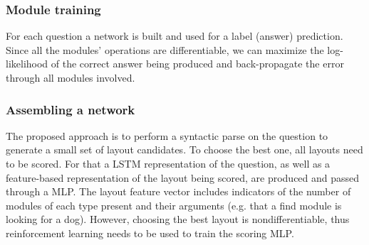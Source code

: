 \documentclass[a4paper,twocolumn]{article}
\begin{document}
\subsubsection*{Module training}
For each question a network is built and used for a label (answer) prediction.  Since all the modules' operations are differentiable, we can maximize the log-likelihood of the correct answer being produced and back-propagate the error through all modules involved.

\subsubsection*{Assembling a network}
    The proposed approach is to perform a syntactic parse on the question to generate a small set of layout candidates. To choose the best one, all layouts need to be scored. For that a LSTM representation of the question, as well as a feature-based representation of the layout being scored, are produced and passed through a MLP. The layout feature vector includes indicators of the number of modules of each type present and their arguments (e.g. that a find module is looking for a dog).
 However, choosing the best layout is nondifferentiable, thus reinforcement learning needs to be used to train the scoring MLP.
\end{document}
